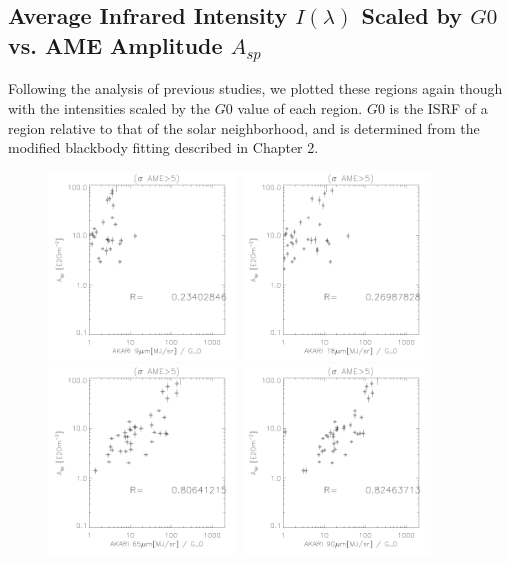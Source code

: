\subsection{Average Infrared Intensity $I({\lambda})$ Scaled by $G0$ vs. AME Amplitude $A_{sp}$}
     Following the analysis of previous studies, we plotted these regions again though with the intensities scaled by the $G0$ value of each region. $G0$ is the ISRF of a region relative to that of the solar neighborhood, and is determined from the modified blackbody fitting described in Chapter 2. 
\begin{figure}[!htb]
\centering
 \includegraphics[width=50mm]{IRIntG0MWAmp/akari9G0_Asp_sp.pdf}
  \includegraphics[width=50mm]{IRIntG0MWAmp/akari18G0_Asp_sp.pdf}
  \includegraphics[width=50mm]{IRIntG0MWAmp/akari65G0_Asp_sp.pdf}
  \includegraphics[width=50mm]{IRIntG0MWAmp/akari90G0_Asp_sp.pdf}

\end{figure}
